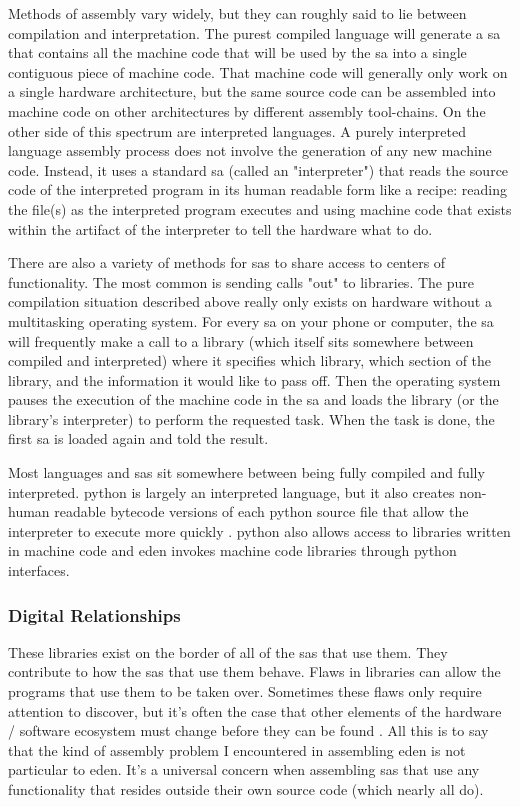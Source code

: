 \documentclass[a4paper,man,natbib,floatsintext]{apa6}
\begin{document}
   Methods of assembly vary widely, but they can roughly said to lie between compilation and interpretation. The purest compiled language will generate a \gls{sa} that contains all the machine code that will be used by the \gls{sa} into a single contiguous piece of machine code. That machine code will generally only work on a single hardware architecture, but the same source code can be assembled into machine code on other architectures by different assembly tool-chains. On the other side of this spectrum are interpreted languages. A purely interpreted language assembly process does not involve the generation of any new machine code. Instead, it uses a standard \gls{sa} (called an "interpreter") that reads the source code of the interpreted program in its human readable form like a recipe: reading the file(s) as the interpreted program executes and using machine code that exists within the artifact of the interpreter to tell the hardware what to do.

   There are also a variety of methods for \glspl{sa} to share access to centers of functionality. The most common is sending calls "out" to libraries. The pure compilation situation described above really only exists on hardware without a multitasking operating system. For every \gls{sa} on your phone or computer, the \gls{sa} will frequently make a call to a library (which itself sits somewhere between compiled and interpreted) where it specifies which library, which section of the library, and the information it would like to pass off. Then the operating system pauses the execution of the machine code in the \gls{sa} and loads the library (or the library's interpreter) to perform the requested task. When the task is done, the first \gls{sa} is loaded again and told the result. 

   Most languages and \glspl{sa} sit somewhere between being fully compiled and fully interpreted. \Gls{python} is largely an interpreted language, but it also creates non-human readable bytecode versions of each python source file that allow the interpreter to execute more quickly \citep{The_Python_Software_Foundation2020-qz}. \Gls{python} also allows access to libraries written in machine code and \acrshort{eden} invokes machine code libraries through \gls{python} interfaces.

   \subsubsection{Digital Relationships}
   These libraries exist on the border of all of the \glspl{sa} that use them. They contribute to how the \glspl{sa} that use them behave. Flaws in libraries can allow the programs that use them to be taken over. Sometimes these flaws only require attention to discover, but it's often the case that other elements of the hardware / software ecosystem must change before they can be found \citep{Huang2003-ki}. All this is to say that the kind of assembly problem I encountered in assembling \acrshort{eden} is not particular to \acrshort{eden}. It's a universal concern when assembling \glspl{sa} that use any functionality that resides outside their own source code (which nearly all do).
\end{document}
